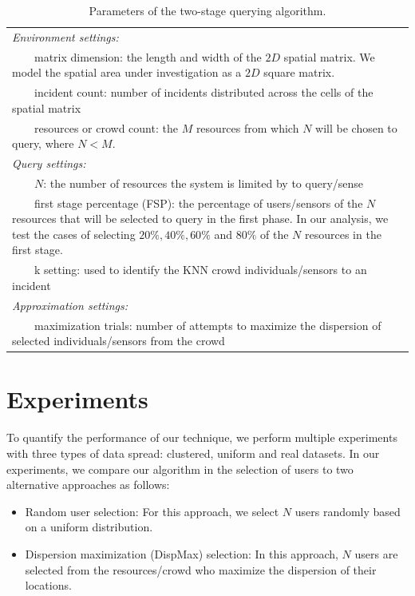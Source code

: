 \documentclass{acm_proc_article-sp}
\newcommand{\tabitem}{~~\llap{\textbullet}~~}
\begin{document}
\begin{table}{}
\centering
\begin{tabulary}{0.5\textwidth}{|L|}
\hline
\textit{Environment settings: }\\
\tabitem matrix dimension: the length and width of the $2D$ spatial matrix. We model the spatial area under investigation as a $2D$ square matrix.\\
\tabitem incident count: number of incidents distributed across the cells of the spatial matrix\\
\tabitem resources or crowd count: the $M$ resources from which $N$ will be chosen to query, where $N < M$.\\
\hline
\textit{Query settings:}\\
\tabitem $N$: the number of resources the system is limited by to query/sense \\
\tabitem first stage percentage (FSP): the percentage of users/sensors of the $N$ resources that will be selected to query in the first phase. In our analysis, we test the cases of selecting $20\%, 40\%, 60\%$ and $80\%$ of the $N$ resources in the first stage.\\
\tabitem k setting: used to identify the KNN crowd individuals/sensors to an incident\\
\hline
\textit{Approximation settings: }\\
\tabitem maximization trials: number of attempts to maximize the dispersion of selected individuals/sensors from the crowd\\
\hline
\end{tabulary}
\caption{Parameters of the two-stage querying algorithm.}
\label{table:systemParameters}
\end{table}


\section{Experiments}
To quantify the performance of our technique, we perform multiple experiments with three types of data spread: clustered, uniform and real datasets. In our experiments, we compare our algorithm in the selection of users to two alternative approaches as follows:
\begin{itemize}
\item Random user selection: For this approach, we select $N$ users randomly based on a uniform distribution.
\item Dispersion maximization (DispMax) selection: In this approach, $N$ users are selected from the resources/crowd who maximize the dispersion of their locations.
\end{itemize}
\end{document}
